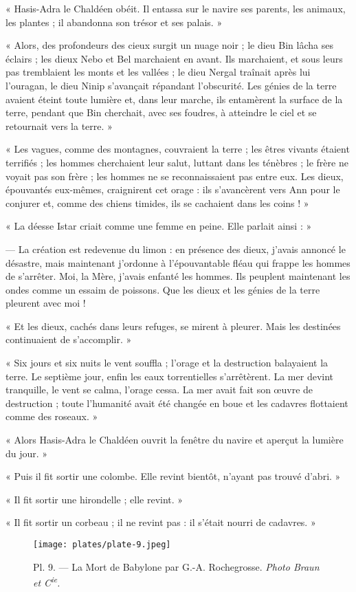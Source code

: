 \documentclass[a4paper, 11pt, oneside, polutonikogreek, french]{article}
\begin{document}
« Hasis-Adra le Chaldéen obéit. Il entassa sur le navire ses parents, les animaux, les plantes ; il abandonna son trésor et ses palais. »

« Alors, des profondeurs des cieux surgit un nuage noir ; le dieu Bin lâcha ses éclairs ; les dieux Nebo et Bel marchaient en avant. Ils marchaient, et sous leurs pas tremblaient les monts et les vallées ; le dieu Nergal traînait après lui l'ouragan, le dieu Ninip s'avançait répandant l'obscurité. Les génies de la terre avaient éteint toute lumière et, dans leur marche, ils entamèrent la surface de la terre, pendant que Bin cherchait, avec ses foudres, à atteindre le ciel et se retournait vers la terre. »

« Les vagues, comme des montagnes, couvraient la terre ; les êtres vivants étaient terrifiés ; les hommes cherchaient leur salut, luttant dans les ténèbres ; le frère ne voyait pas son frère ; les hommes ne se reconnaissaient pas entre eux. Les dieux, épouvantés eux-mêmes, craignirent cet orage : ils s'avancèrent vers Ann pour le conjurer et, comme des chiens timides, ils se cachaient dans les coins ! »

« La déesse Istar criait comme une femme en peine. Elle parlait ainsi : »

--- La création est redevenue du limon : en présence des dieux, j'avais annoncé le désastre, mais maintenant j'ordonne à l'épouvantable fléau qui frappe les hommes de s'arrêter. Moi, la Mère, j'avais enfanté les hommes. Ils peuplent maintenant les ondes comme un essaim de poissons. Que les dieux et les génies de la terre pleurent avec moi !

« Et les dieux, cachés dans leurs refuges, se mirent à pleurer. Mais les destinées continuaient de s'accomplir. »

« Six jours et six nuits le vent souffla ; l'orage et la destruction balayaient la terre. Le septième jour, enfin les eaux torrentielles s'arrêtèrent. La mer devint tranquille, le vent se calma, l'orage cessa. La mer avait fait son œuvre de destruction ; toute l'humanité avait été changée en boue et les cadavres flottaient comme des roseaux. »

« Alors Hasis-Adra le Chaldéen ouvrit la fenêtre du navire et aperçut la lumière du jour. »

« Puis il fit sortir une colombe. Elle revint bientôt, n'ayant pas trouvé d'abri. »

« Il fit sortir une hirondelle ; elle revint. »

« Il fit sortir un corbeau ; il ne revint pas : il s'était nourri de cadavres. »
\clearpage
\begin{landscape}
\begin{figure}[H]
\centering
\texttt{[image: plates/plate-9.jpeg]}
\caption{\Fontauri Pl. 9. --- La Mort de Babylone par G.-A. Rochegrosse. \emph{Photo Braun et C\textsuperscript{ie}.}}
\end{figure}
\end{landscape}
\clearpage
\end{document}
